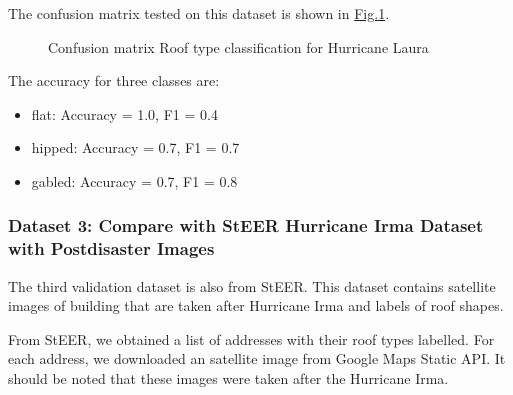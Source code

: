 \documentclass[letterpaper,10pt,english]{sphinxmanual}
\begin{document}
\sphinxAtStartPar
The confusion matrix tested on this dataset is shown in \hyperref[\detokenize{common/technical_manual/roof:fig-confusion-roof-laura}]{Fig.\@ \ref{\detokenize{common/technical_manual/roof:fig-confusion-roof-laura}}}.

\begin{figure}[htbp]
\centering
\capstart

\noindent{}
\caption{Confusion matrix \sphinxhyphen{} Roof type classification for Hurricane Laura}\label{\detokenize{common/technical_manual/roof:id5}}\label{\detokenize{common/technical_manual/roof:fig-confusion-roof-laura}}\end{figure}

\sphinxAtStartPar
The accuracy for three classes are:
\begin{itemize}
\item {} 
\sphinxAtStartPar
flat: Accuracy = 1.0, F1 = 0.4

\item {} 
\sphinxAtStartPar
hipped: Accuracy = 0.7, F1 = 0.7

\item {} 
\sphinxAtStartPar
gabled: Accuracy = 0.7, F1 = 0.8

\end{itemize}


\subsubsection{Dataset 3: Compare with StEER Hurricane Irma Dataset with Post\sphinxhyphen{}disaster Images}
\label{\detokenize{common/technical_manual/roof:dataset-3-compare-with-steer-hurricane-irma-dataset-with-post-disaster-images}}


\sphinxAtStartPar
The third validation dataset is also from StEER.
This dataset contains satellite images of building that are taken after Hurricane Irma and labels of roof shapes.

\sphinxAtStartPar
From StEER, we obtained a list of addresses with their roof types labelled.
For each address, we downloaded an satellite image from Google Maps Static API.
It should be noted that these images were taken after the Hurricane Irma.

\sphinxAtStartPar
{}
\end{document}
